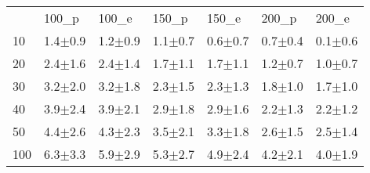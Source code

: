\begin{tabular}{lllllll}
 & 100_p & 100_e & 150_p & 150_e & 200_p & 200_e \\
10 & {\cellcolor[HTML]{D9D9D9}} \color[HTML]{000000} 1.4$\pm$0.9 & {\cellcolor[HTML]{CCCCCC}} \color[HTML]{000000} 1.2$\pm$0.9 & {\cellcolor[HTML]{D9D9D9}} \color[HTML]{000000} 1.1$\pm$0.7 & {\cellcolor[HTML]{BBBBBB}} \color[HTML]{000000} 0.6$\pm$0.7 & {\cellcolor[HTML]{DCDCDC}} \color[HTML]{000000} 0.7$\pm$0.4 & {\cellcolor[HTML]{959595}} \color[HTML]{F1F1F1} 0.1$\pm$0.6 \\
20 & {\cellcolor[HTML]{DBDBDB}} \color[HTML]{000000} 2.4$\pm$1.6 & {\cellcolor[HTML]{E1E1E1}} \color[HTML]{000000} 2.4$\pm$1.4 & {\cellcolor[HTML]{D8D8D8}} \color[HTML]{000000} 1.7$\pm$1.1 & {\cellcolor[HTML]{DBDBDB}} \color[HTML]{000000} 1.7$\pm$1.1 & {\cellcolor[HTML]{DFDFDF}} \color[HTML]{000000} 1.2$\pm$0.7 & {\cellcolor[HTML]{D4D4D4}} \color[HTML]{000000} 1.0$\pm$0.7 \\
30 & {\cellcolor[HTML]{DCDCDC}} \color[HTML]{000000} 3.2$\pm$2.0 & {\cellcolor[HTML]{E5E5E5}} \color[HTML]{000000} 3.2$\pm$1.8 & {\cellcolor[HTML]{DCDCDC}} \color[HTML]{000000} 2.3$\pm$1.5 & {\cellcolor[HTML]{E0E0E0}} \color[HTML]{000000} 2.3$\pm$1.3 & {\cellcolor[HTML]{E0E0E0}} \color[HTML]{000000} 1.8$\pm$1.0 & {\cellcolor[HTML]{E3E3E3}} \color[HTML]{000000} 1.7$\pm$1.0 \\
40 & {\cellcolor[HTML]{DFDFDF}} \color[HTML]{000000} 3.9$\pm$2.4 & {\cellcolor[HTML]{E7E7E7}} \color[HTML]{000000} 3.9$\pm$2.1 & {\cellcolor[HTML]{DFDFDF}} \color[HTML]{000000} 2.9$\pm$1.8 & {\cellcolor[HTML]{E5E5E5}} \color[HTML]{000000} 2.9$\pm$1.6 & {\cellcolor[HTML]{E2E2E2}} \color[HTML]{000000} 2.2$\pm$1.3 & {\cellcolor[HTML]{E9E9E9}} \color[HTML]{000000} 2.2$\pm$1.2 \\
50 & {\cellcolor[HTML]{E0E0E0}} \color[HTML]{000000} 4.4$\pm$2.6 & {\cellcolor[HTML]{E9E9E9}} \color[HTML]{000000} 4.3$\pm$2.3 & {\cellcolor[HTML]{E1E1E1}} \color[HTML]{000000} 3.5$\pm$2.1 & {\cellcolor[HTML]{E5E5E5}} \color[HTML]{000000} 3.3$\pm$1.8 & {\cellcolor[HTML]{E2E2E2}} \color[HTML]{000000} 2.6$\pm$1.5 & {\cellcolor[HTML]{E8E8E8}} \color[HTML]{000000} 2.5$\pm$1.4 \\
100 & {\cellcolor[HTML]{E9E9E9}} \color[HTML]{000000} 6.3$\pm$3.3 & {\cellcolor[HTML]{EFEFEF}} \color[HTML]{000000} 5.9$\pm$2.9 & {\cellcolor[HTML]{EDEDED}} \color[HTML]{000000} 5.3$\pm$2.7 & {\cellcolor[HTML]{F0F0F0}} \color[HTML]{000000} 4.9$\pm$2.4 & {\cellcolor[HTML]{EFEFEF}} \color[HTML]{000000} 4.2$\pm$2.1 & {\cellcolor[HTML]{F2F2F2}} \color[HTML]{000000} 4.0$\pm$1.9 \\

\end{tabular}
